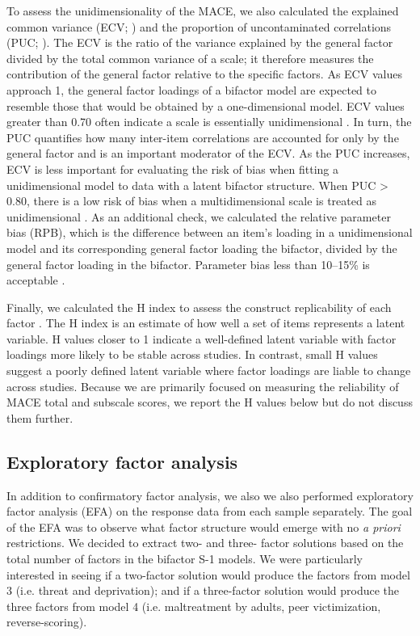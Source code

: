 \documentclass[letterpaper,man,natbib,floatsintext,longtable]{apa6}
\begin{document}
To assess the unidimensionality of the MACE, we also calculated the explained common variance (ECV; \citealt{sijtsma2009use}) and the proportion of uncontaminated correlations (PUC; \citealt{reise2013multidimensionality}). The ECV is the ratio of the variance explained by the general factor divided by the total common variance of a scale; it therefore measures the contribution of the general factor relative to the specific factors. As ECV values approach 1, the general factor loadings of a bifactor model are expected to resemble those that would be obtained by a one-dimensional model. ECV values greater than 0.70 often indicate a scale is essentially unidimensional \citep{rodriguez2016applying}. In turn, the PUC quantifies how many inter-item correlations are accounted for only by the general factor and is an important moderator of the ECV. As the PUC increases, ECV is less important for evaluating the risk of bias when fitting a unidimensional model to data with a latent bifactor structure. When PUC > 0.80, there is a low risk of bias when a multidimensional scale is treated as unidimensional \citep{reise2013multidimensionality}. As an additional check, we calculated the relative parameter bias (RPB), which is the difference between an item's loading in a unidimensional model and its corresponding general factor loading the bifactor, divided by the general factor loading in the bifactor. Parameter bias less than 10–15\% is acceptable \citep{muthen1987structural}.

Finally, we calculated the H index to assess the construct replicability of each factor \citep{hancock2001rethinking}. The H index is an estimate of how well a set of items represents a latent variable. H values closer to 1 indicate a well-defined latent variable with factor loadings more likely to be stable across studies. In contrast, small H values suggest a poorly defined latent variable where factor loadings are liable to change across studies. Because we are primarily focused on measuring the reliability of MACE total and subscale scores, we report the H values below but do not discuss them further.

\subsection{Exploratory factor analysis}

In addition to confirmatory factor analysis, we also we also performed exploratory factor analysis (EFA) on the response data from each sample separately. The goal of the EFA was to observe what factor structure would emerge with no \emph{a priori} restrictions. We decided to extract two- and three- factor solutions based on the total number of factors in the bifactor S-1 models. We were particularly interested in seeing if a two-factor solution would produce the factors from model 3 (i.e. threat and deprivation); and if a three-factor solution would produce the three factors from model 4 (i.e. maltreatment by adults, peer victimization, reverse-scoring). 
\end{document}
